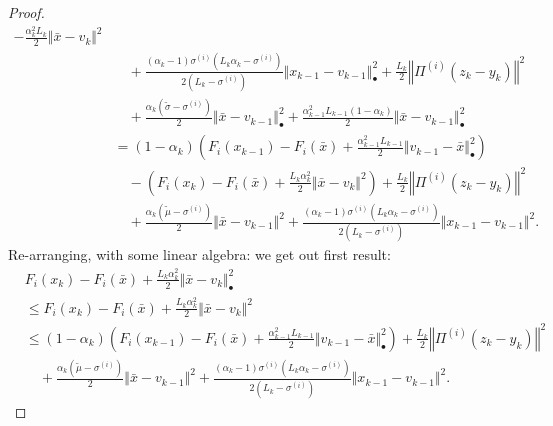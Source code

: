 \documentclass[12pt]{article}
\begin{document}
\begin{proof}
{\begin{align*}
            - \frac{\alpha_k^2L_k}{2}\Vert \bar x - v_k\Vert^2 
                \\ &\quad 
                + \frac{(\alpha_k - 1)\sigma^{(i)}\left(L_k\alpha_k - \sigma^{(i)}\right)}{2\left(L_k - \sigma^{(i)}\right)}\Vert x_{k - 1} - v_{k - 1} \Vert^2_\bullet
                + \frac{L_k}{2}\left\Vert \Pi^{(i)}(z_k - y_k)\right\Vert^2
                \\ &\quad 
                + \frac{\alpha_k(\tilde\sigma - \sigma^{(i)})}{2} \Vert \bar x - v_{k - 1}\Vert^2_\bullet
                + \frac{\alpha_{k - 1}^2L_{k - 1}(1 - \alpha_k)}{2} \Vert \bar x - v_{k - 1}\Vert^2_\bullet
            \\
            &= (1 - \alpha_k)\left(
                F_i(x_{k - 1}) - F_i(\bar x) + \frac{\alpha_{k - 1}^2L_{k - 1}}{2}\Vert v_{k - 1} - \bar x\Vert^2_\bullet
            \right) 
                \\ & \quad
                - \left(
                    F_i(x_{k}) - F_i(\bar x) + \frac{L_k\alpha_k^2}{2}\Vert \bar x - v_k\Vert^2 
                \right) + \frac{L_k}{2}\left\Vert \Pi^{(i)}(z_k - y_k)\right\Vert^2
                \\ &\quad 
                + \frac{\alpha_k(\tilde\mu - \sigma^{(i)})}{2}\Vert \bar x - v_{k - 1}\Vert^2
                + \frac{(\alpha_k - 1)\sigma^{(i)}\left(L_k\alpha_k - \sigma^{(i)}\right)}{2\left(L_k - \sigma^{(i)}\right)}\Vert x_{k - 1} - v_{k - 1} \Vert^2.
        \end{align*}
        }
        Re-arranging, with some linear algebra:  we get out first result: 
        \begin{align*}
            &F_i(x_{k}) - F_i(\bar x) + \frac{L_k\alpha_k^2}{2}\Vert \bar x - v_k\Vert^2_\bullet 
            \\
            &\le 
            F_i(x_{k}) - F_i(\bar x) + \frac{L_k\alpha_k^2}{2}\Vert \bar x - v_k\Vert^2 
            \\
            &\le 
            (1 - \alpha_k)\left(
                F_i(x_{k - 1}) - F_i(\bar x) + \frac{\alpha_{k - 1}^2L_{k - 1}}{2}\Vert v_{k - 1} - \bar x\Vert^2_\bullet
            \right)     
            + \frac{L_k}{2}\left\Vert \Pi^{(i)}(z_k - y_k)\right\Vert^2
                \\ &\quad 
                + \frac{\alpha_k(\tilde\mu - \sigma^{(i)})}{2}\Vert \bar x - v_{k - 1}\Vert^2
                + \frac{(\alpha_k - 1)\sigma^{(i)}\left(L_k\alpha_k - \sigma^{(i)}\right)}{2\left(L_k - \sigma^{(i)}\right)}\Vert x_{k - 1} - v_{k - 1} \Vert^2.

\end{align*}
\end{proof}
\end{document}
